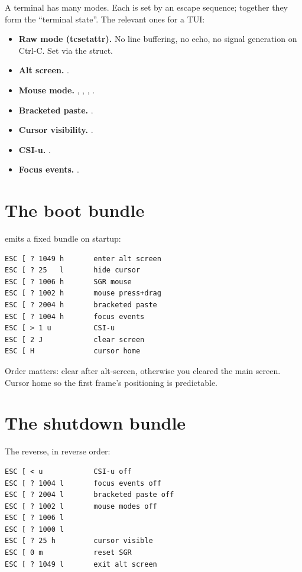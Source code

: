 A terminal has many modes. Each is set by an escape sequence;
together they form the ``terminal state''. The relevant ones
for a TUI:

\begin{itemize}[leftmargin=*]
  \item \textbf{Raw mode (tcsetattr).} No line buffering, no
    echo, no signal generation on Ctrl-C. Set via the
     struct.
  \item \textbf{Alt screen.} .
  \item \textbf{Mouse mode.} , ,
    , .
  \item \textbf{Bracketed paste.} .
  \item \textbf{Cursor visibility.} .
  \item \textbf{CSI-u.} .
  \item \textbf{Focus events.} .
\end{itemize}

\section{The boot bundle}

\maya{} emits a fixed bundle on startup:

\begin{lstlisting}
ESC [ ? 1049 h       enter alt screen
ESC [ ? 25   l       hide cursor
ESC [ ? 1006 h       SGR mouse
ESC [ ? 1002 h       mouse press+drag
ESC [ ? 2004 h       bracketed paste
ESC [ ? 1004 h       focus events
ESC [ > 1 u          CSI-u
ESC [ 2 J            clear screen
ESC [ H              cursor home
\end{lstlisting}

Order matters: clear after alt-screen, otherwise you cleared
the main screen. Cursor home so the first frame's positioning
is predictable.

\section{The shutdown bundle}

The reverse, in reverse order:

\begin{lstlisting}
ESC [ < u            CSI-u off
ESC [ ? 1004 l       focus events off
ESC [ ? 2004 l       bracketed paste off
ESC [ ? 1002 l       mouse modes off
ESC [ ? 1006 l
ESC [ ? 1000 l
ESC [ ? 25 h         cursor visible
ESC [ 0 m            reset SGR
ESC [ ? 1049 l       exit alt screen
\end{lstlisting}

